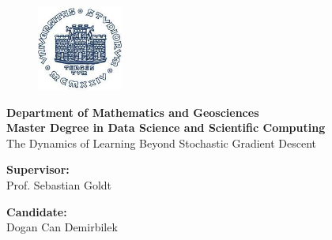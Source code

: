 \begin{titlepage} 
\begin{figure}[t] 
    \centering\includegraphics[width=0.25\textwidth]{figures/logo.jpeg}
\end{figure}
\vspace{20mm}

\begin{Large}
 \begin{center}
	\textbf{Department of Mathematics and Geosciences\\ Master Degree in Data Science and Scientific Computing \\}
	\vspace{20mm}
    {\Large{The Dynamics of Learning Beyond Stochastic Gradient Descent  }}\\
	\vspace{10mm}
	{\huge{\bf }}
\end{center}
\end{Large}


\vspace{36mm}
\begin{minipage}[t]{0.47\textwidth}\raggedright
	{\large{\textbf{Supervisor:}\\ Prof. Sebastian Goldt}}
\end{minipage}
\hfill
\begin{minipage}[t]{0.47\textwidth}\raggedleft
	{\large{ \textbf{Candidate:} \\ Dogan Can Demirbilek}}
\end{minipage}

\vspace{25mm}

\hrulefill

\vspace{5mm}


\end{titlepage}